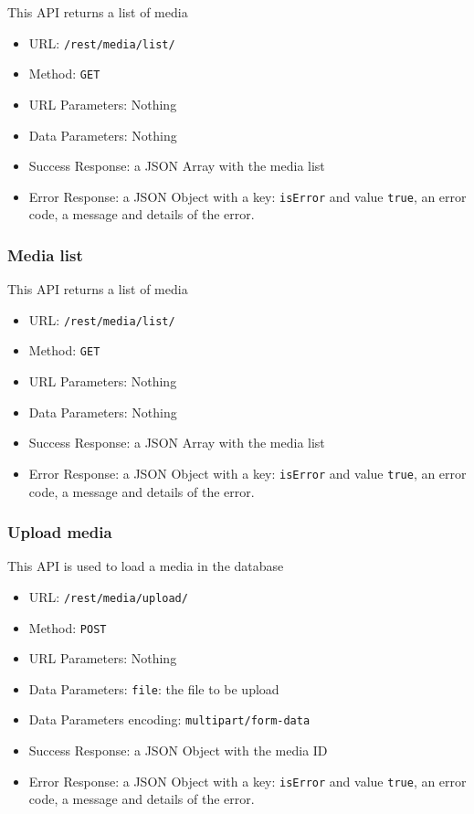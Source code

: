 This API returns a list of media

\begin{itemize}
    \item URL: \texttt{/rest/media/list/}
    \item Method: \texttt{GET}
    \item URL Parameters: Nothing
    \item Data Parameters: Nothing
    \item Success Response: a JSON Array with the media list
    \item Error Response: a JSON Object with a key: \texttt{isError}  and value \texttt{true}, an error code, a message and details of the error.
\end{itemize}

\subsubsection*{Media list}

This API returns a list of media

\begin{itemize}
    \item URL: \texttt{/rest/media/list/}
    \item Method: \texttt{GET}
    \item URL Parameters: Nothing
    \item Data Parameters: Nothing
    \item Success Response: a JSON Array with the media list
    \item Error Response: a JSON Object with a key: \texttt{isError}  and value \texttt{true}, an error code, a message and details of the error.
\end{itemize}

\subsubsection*{Upload media}

This API is used to load a media in the database

\begin{itemize}
    \item URL: \texttt{/rest/media/upload/}
    \item Method: \texttt{POST}
    \item URL Parameters: Nothing
    \item Data Parameters: \texttt{file}: the file to be upload
    \item Data Parameters encoding: \texttt{multipart/form-data}
    \item Success Response: a JSON Object with the media ID
    \item Error Response: a JSON Object with a key: \texttt{isError}  and value \texttt{true}, an error code, a message and details of the error.
\end{itemize}

